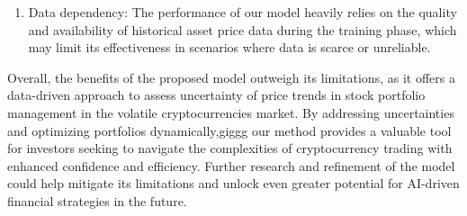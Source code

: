 \begin{enumerate}
	
	\item Data dependency: The performance of our model heavily relies on the quality and availability of historical asset price data during the training phase, which may limit its effectiveness in scenarios where data is scarce or unreliable.
	
	
\end{enumerate}


Overall, the benefits of the proposed model outweigh its limitations, as it offers a data-driven approach to assess uncertainty of price trends in stock portfolio management in the volatile cryptocurrencies market. By addressing uncertainties and optimizing portfolios dynamically,giggg our method provides a valuable tool for investors seeking to navigate the complexities of cryptocurrency trading with enhanced confidence and efficiency. Further research and refinement of the model could help mitigate its limitations and unlock even greater potential for AI-driven financial strategies in the future.